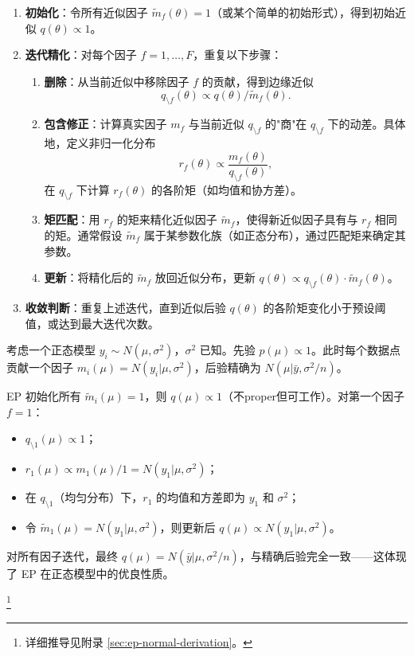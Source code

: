 \begin{enumerate}
\item \textbf{初始化}：令所有近似因子 $\tilde{m}_f(\theta) = 1$（或某个简单的初始形式），得到初始近似 $q(\theta) \propto 1$。

\item \textbf{迭代精化}：对每个因子 $f = 1, \ldots, F$，重复以下步骤：
\begin{enumerate}
\item \textbf{删除}：从当前近似中移除因子 $f$ 的贡献，得到边缘近似
\[
q_{\setminus f}(\theta) \propto q(\theta) / \tilde{m}_f(\theta).
\]

\item \textbf{包含修正}：计算真实因子 $m_f$ 与当前近似 $q_{\setminus f}$ 的"商"在 $q_{\setminus f}$ 下的动差。具体地，定义非归一化分布
\[
r_f(\theta) \propto \frac{m_f(\theta)}{q_{\setminus f}(\theta)},
\]
在 $q_{\setminus f}$ 下计算 $r_f(\theta)$ 的各阶矩（如均值和协方差）。

\item \textbf{矩匹配}：用 $r_f$ 的矩来精化近似因子 $\tilde{m}_f$，使得新近似因子具有与 $r_f$ 相同的矩。通常假设 $\tilde{m}_f$ 属于某参数化族（如正态分布），通过匹配矩来确定其参数。

\item \textbf{更新}：将精化后的 $\tilde{m}_f$ 放回近似分布，更新 $q(\theta) \propto q_{\setminus f}(\theta) \cdot \tilde{m}_f(\theta)$。
\end{enumerate}
\item \textbf{收敛判断}：重复上述迭代，直到近似后验 $q(\theta)$ 的各阶矩变化小于预设阈值，或达到最大迭代次数。
\end{enumerate}

\begin{Example}[EP 对正态似然的精化]\label{ex:ep-normal-likelihood}
考虑一个正态模型 $y_i \sim N(\mu, \sigma^2)$，$\sigma^2$ 已知。先验 $p(\mu) \propto 1$。此时每个数据点贡献一个因子 $m_i(\mu) = N(y_i|\mu, \sigma^2)$，后验精确为 $N(\mu|\bar{y}, \sigma^2/n)$。

EP 初始化所有 $\tilde{m}_i(\mu) = 1$，则 $q(\mu) \propto 1$（不proper但可工作）。对第一个因子 $f=1$：
\begin{itemize}
\item $q_{\setminus 1}(\mu) \propto 1$；
\item $r_1(\mu) \propto m_1(\mu) / 1 = N(y_1|\mu, \sigma^2)$；
\item 在 $q_{\setminus 1}$（均匀分布）下，$r_1$ 的均值和方差即为 $y_1$ 和 $\sigma^2$；
\item 令 $\tilde{m}_1(\mu) = N(y_1|\mu, \sigma^2)$，则更新后 $q(\mu) \propto N(y_1|\mu, \sigma^2)$。
\end{itemize}
对所有因子迭代，最终 $q(\mu) = N(\bar{y}|\mu, \sigma^2/n)$，与精确后验完全一致——这体现了 EP 在正态模型中的优良性质。
\end{Example}\footnote{详细推导见附录 \cref{sec:ep-normal-derivation}。}

